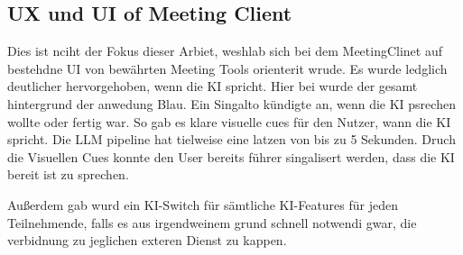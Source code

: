 \subsection{UX und UI of Meeting Client}

Dies ist nciht der Fokus dieser Arbiet, weshlab sich bei dem MeetingClinet auf bestehdne UI von bewährten
Meeting Tools orienterit wrude. Es wurde ledglich deutlicher hervorgehoben, wenn die KI spricht. Hier bei
wurde der gesamt hintergrund der anwedung Blau. Ein Singalto kündigte an, wenn die KI psrechen wollte oder
fertig war. So gab es klare visuelle cues für den Nutzer, wann die KI spricht.
Die LLM pipeline hat tielweise eine latzen von bis zu 5 Sekunden. Druch die Visuellen Cues konnte den User
bereits führer singalisert werden, dass die KI bereit ist zu sprechen.

Außerdem gab wurd ein KI-Switch für sämtliche KI-Features für jeden Teilnehmende, falls es aus irgendweinem
grund schnell notwendi gwar, die verbidnung zu jeglichen exteren Dienst zu kappen.

